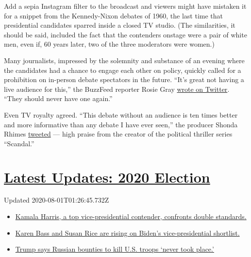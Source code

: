 Add a sepia Instagram filter to the broadcast and viewers might have
mistaken it for a snippet from the Kennedy-Nixon debates of 1960, the
last time that presidential candidates sparred inside a closed TV
studio. (The similarities, it should be said, included the fact that the
contenders onstage were a pair of white men, even if, 60 years later,
two of the three moderators were women.)

Many journalists, impressed by the solemnity and substance of an evening
where the candidates had a chance to engage each other on policy,
quickly called for a prohibition on in-person debate spectators in the
future. ``It's great not having a live audience for this,'' the BuzzFeed
reporter Rosie Gray
\href{https://twitter.com/RosieGray/status/1239343497485922304?s=20}{wrote
on Twitter}. ``They should never have one again.''

Even TV royalty agreed. ``This debate without an audience is ten times
better and more informative than any debate I have ever seen,'' the
producer Shonda Rhimes
\href{https://twitter.com/shondarhimes/status/1239350507002462209?s=20}{tweeted}
--- high praise from the creator of the political thriller series
``Scandal.''

\hypertarget{latest-updates-2020-election}{%
\section{\texorpdfstring{\href{https://www.nytimes.com/2020/07/31/us/elections/biden-vs-trump.html?action=click\&pgtype=Article\&state=default\&region=MAIN_CONTENT_1\&context=storylines_live_updates}{Latest
Updates: 2020
Election}}{Latest Updates: 2020 Election}}\label{latest-updates-2020-election}}

Updated 2020-08-01T01:26:45.732Z

\begin{itemize}
\tightlist
\item
  \href{https://www.nytimes.com/2020/07/31/us/elections/biden-vs-trump.html?action=click\&pgtype=Article\&state=default\&region=MAIN_CONTENT_1\&context=storylines_live_updates\#link-29fdff45}{Kamala
  Harris, a top vice-presidential contender, confronts double
  standards.}
\item
  \href{https://www.nytimes.com/2020/07/31/us/elections/biden-vs-trump.html?action=click\&pgtype=Article\&state=default\&region=MAIN_CONTENT_1\&context=storylines_live_updates\#link-13ec3d9c}{Karen
  Bass and Susan Rice are rising on Biden's vice-presidential
  shortlist.}
\item
  \href{https://www.nytimes.com/2020/07/31/us/elections/biden-vs-trump.html?action=click\&pgtype=Article\&state=default\&region=MAIN_CONTENT_1\&context=storylines_live_updates\#link-49e9a016}{Trump
  says Russian bounties to kill U.S. troops `never took place.'}
\end{itemize}

